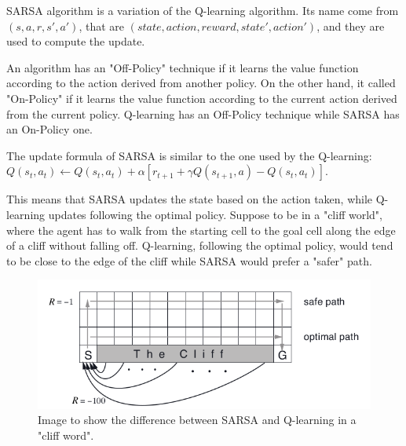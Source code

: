 SARSA algorithm\cite{qiang2011reinforcement} is a variation of the Q-learning algorithm. Its name come from $(s, a, r, s', a')$, that are $(state, action, reward, state', action')$, and they are used to compute the update.

An algorithm has an "Off-Policy" technique if it learns the value function according to the action derived from another policy. On the other hand, it called "On-Policy" if it learns the value function according to the current action derived from the current policy.
Q-learning has an Off-Policy technique while SARSA has an On-Policy one.

The update formula of SARSA is similar to the one used by the Q-learning: $Q(s_t, a_t) \leftarrow Q(s_t, a_t) + \alpha [r_{t+1} + \gamma Q(s_{t+1}, a) - Q(s_t, a_t)]$.

This means that SARSA updates the state based on the action taken, while Q-learning updates following the optimal policy.
Suppose to be in a "cliff world", where the agent has to walk from the starting cell to the goal cell along the edge of a cliff without falling off. Q-learning, following the optimal policy, would tend to be close to the edge of the cliff while SARSA would prefer a "safer" path.

\begin{figure}[ht]
    \centering
    \includegraphics[scale=0.4]{images/cliff_word.png}
    \caption{Image to show the difference between SARSA and Q-learning in a "cliff word".}
    \label{fig:cliff_word}
\end{figure}

